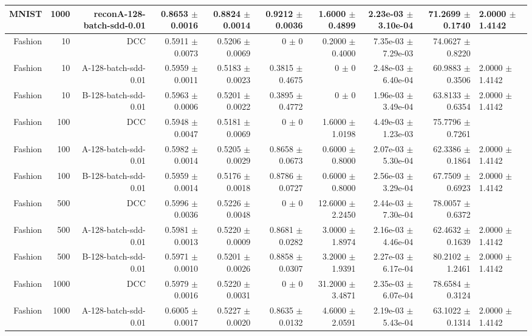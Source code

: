 \begin{table}[ht]
{\begin{tabular}{ | r | r | r | r | r | r | r | r | r |}
MNIST & 1000 & reconA-128-batch-sdd-0.01 & 0.8653 $\pm$ 0.0016 & 0.8824 $\pm$ 0.0014 & 0.9212 $\pm$ 0.0036 & 1.6000 $\pm$ 0.4899 & 2.23e-03 $\pm$ 3.10e-04 & 71.2699 $\pm$ 0.1740 & 2.0000 $\pm$ 1.4142 \\ \hline 
Fashion & 10 & DCC & 0.5911 $\pm$ 0.0073 & 0.5206 $\pm$ 0.0069 & 0 $\pm$ 0 & 0.2000 $\pm$ 0.4000 & 7.35e-03 $\pm$ 7.29e-03 & 74.0627 $\pm$ 0.8220 \\ 
Fashion & 10 & A-128-batch-sdd-0.01 & 0.5959 $\pm$ 0.0011 & 0.5183 $\pm$ 0.0023 & 0.3815 $\pm$ 0.4675 & 0 $\pm$ 0 & 2.48e-03 $\pm$ 6.40e-04 & 60.9883 $\pm$ 0.3506 & 2.0000 $\pm$ 1.4142 \\ \hdashline 
Fashion & 10 & B-128-batch-sdd-0.01 & 0.5963 $\pm$ 0.0006 & 0.5201 $\pm$ 0.0022 & 0.3895 $\pm$ 0.4772 & 0 $\pm$ 0 & 1.96e-03 $\pm$ 3.49e-04 & 63.8133 $\pm$ 0.6354 & 2.0000 $\pm$ 1.4142 \\ 
Fashion & 100 & DCC & 0.5948 $\pm$ 0.0047 & 0.5181 $\pm$ 0.0069 & 0 $\pm$ 0 & 1.6000 $\pm$ 1.0198 & 4.49e-03 $\pm$ 1.23e-03 & 75.7796 $\pm$ 0.7261 \\ \hdashline 
Fashion & 100 & A-128-batch-sdd-0.01 & 0.5982 $\pm$ 0.0014 & 0.5205 $\pm$ 0.0029 & 0.8658 $\pm$ 0.0673 & 0.6000 $\pm$ 0.8000 & 2.07e-03 $\pm$ 5.30e-04 & 62.3386 $\pm$ 0.1864 & 2.0000 $\pm$ 1.4142 \\ 
Fashion & 100 & B-128-batch-sdd-0.01 & 0.5959 $\pm$ 0.0014 & 0.5176 $\pm$ 0.0018 & 0.8786 $\pm$ 0.0727 & 0.6000 $\pm$ 0.8000 & 2.56e-03 $\pm$ 3.29e-04 & 67.7509 $\pm$ 0.6923 & 2.0000 $\pm$ 1.4142 \\ \hdashline 
Fashion & 500 & DCC & 0.5996 $\pm$ 0.0036 & 0.5226 $\pm$ 0.0048 & 0 $\pm$ 0 & 12.6000 $\pm$ 2.2450 & 2.44e-03 $\pm$ 7.30e-04 & 78.0057 $\pm$ 0.6372 \\ 
Fashion & 500 & A-128-batch-sdd-0.01 & 0.5981 $\pm$ 0.0013 & 0.5220 $\pm$ 0.0009 & 0.8681 $\pm$ 0.0282 & 3.0000 $\pm$ 1.8974 & 2.16e-03 $\pm$ 4.46e-04 & 62.4632 $\pm$ 0.1639 & 2.0000 $\pm$ 1.4142 \\ \hdashline 
Fashion & 500 & B-128-batch-sdd-0.01 & 0.5971 $\pm$ 0.0010 & 0.5201 $\pm$ 0.0026 & 0.8858 $\pm$ 0.0307 & 3.2000 $\pm$ 1.9391 & 2.27e-03 $\pm$ 6.17e-04 & 80.2102 $\pm$ 1.2461 & 2.0000 $\pm$ 1.4142 \\ 
Fashion & 1000 & DCC & 0.5979 $\pm$ 0.0016 & 0.5220 $\pm$ 0.0031 & 0 $\pm$ 0 & 31.2000 $\pm$ 3.4871 & 2.35e-03 $\pm$ 6.07e-04 & 78.6584 $\pm$ 0.3124 \\ \hdashline 
Fashion & 1000 & A-128-batch-sdd-0.01 & 0.6005 $\pm$ 0.0017 & 0.5227 $\pm$ 0.0020 & 0.8635 $\pm$ 0.0132 & 4.6000 $\pm$ 2.0591 & 2.19e-03 $\pm$ 5.43e-04 & 63.1022 $\pm$ 0.1314 & 2.0000 $\pm$ 1.4142 \\ 

\end{tabular}}
\end{table}
